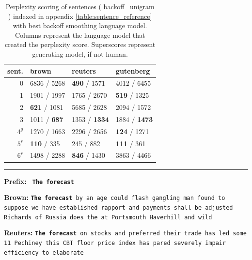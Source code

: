 \documentclass[11pt,a4paper]{article}
\begin{document}
\begin{table}
\begin{tabular}{rlll}
\hline
 sent.   & brown       & reuters     & gutenberg   \\
\hline
  0 & 6836 / 5268 & \textbf{ 490 } / 1571  & 4012 / 6455 \\
  1 & 1901 / 1997 & 1765 / 2670 & \textbf{ 519 } / 1325  \\
  2 & \textbf{ 621 } / 1081  & 5685 / 2628 & 2094 / 1572 \\
  3 & 1011 / \textbf{ 687 }  & 1353 / \textbf{ 1334 } & 1884 / \textbf{ 1473 } \\
  $4^g$ & 1270 / 1663 & 2296 / 2656 & \textbf{ 124 } / 1271   \\
  $5^r$ & \textbf{ 110 } / 335   & 245  / 882   & \textbf{ 111 } / 361   \\
  $6^r$ & 1498 / 2288 & \textbf{ 846 } / 1430  & 3863 / 4466 \\
\hline
\end{tabular}
\caption{Perplexity scoring of sentences ( backoff \ unigram ) indexed in appendix \ref{table:sentence_reference}  with best
  backoff smoothing language model. Columns represent the language model that
created the perplexity score. Superscores represent generating model, if not human.}
\label{table:sentence_scoring}
\end{table}


\rule{0.49\textwidth}{0.4pt}
\textbf{Prefix:} \texttt{ \textbf{The forecast} }
\vspace{1mm}

\textbf{Brown:} \texttt{\textbf{The forecast} by an age could flash gangling man found to suppose we have established rapport and payments shall be adjusted Richards of Russia does the at Portsmouth Haverhill and wild}
\vspace{1mm}

\textbf{Reuters:}  \texttt{\textbf{The forecast} on stocks and preferred their trade has led some 11 Pechiney this CBT floor price index has pared severely impair efficiency to elaborate}
\vspace{1mm}
\end{document}
